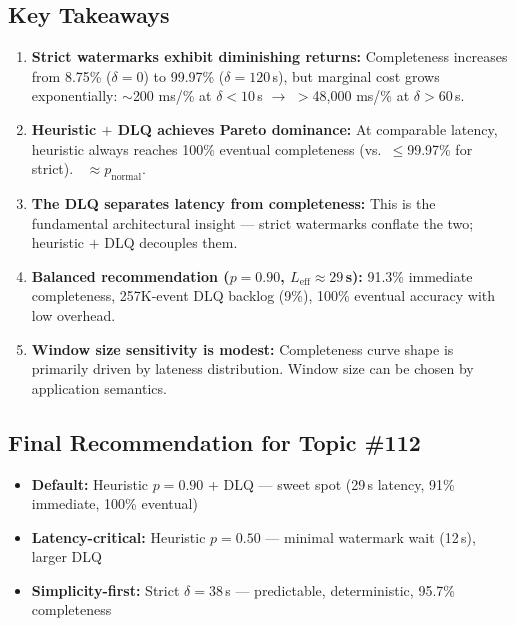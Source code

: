\documentclass[11pt,a4paper]{article}
\DeclareMathOperator{\Cimm}{C_{\text{imm}}}
\newcommand{\Leff}{L_{\text{eff}}}
\begin{document}
\subsection*{Key Takeaways}
\begin{enumerate}[leftmargin=*, itemsep=3pt]
  \item \textbf{Strict watermarks exhibit diminishing returns:} Completeness increases from 8.75\% ($\delta{=}0$) to 99.97\% ($\delta{=}120$\,s), but marginal cost grows exponentially: $\sim$200 ms/\% at $\delta{<}10$\,s $\to$ $>$48,000 ms/\% at $\delta{>}60$\,s.
  \item \textbf{Heuristic $+$ DLQ achieves Pareto dominance:} At comparable latency, heuristic always reaches 100\% eventual completeness (vs.\ $\leq$99.97\% for strict). $\Cimm \approx p_{\text{normal}}$.
  \item \textbf{The DLQ separates latency from completeness:} This is the fundamental architectural insight --- strict watermarks conflate the two; heuristic $+$ DLQ decouples them.
  \item \textbf{Balanced recommendation ($p{=}0.90$, $\Leff{\approx}29$\,s):} 91.3\% immediate completeness, 257K-event DLQ backlog (9\%), 100\% eventual accuracy with low overhead.
  \item \textbf{Window size sensitivity is modest:} Completeness curve shape is primarily driven by lateness distribution. Window size can be chosen by application semantics.
\end{enumerate}

\subsection*{Final Recommendation for Topic \#112}

\begin{itemize}[leftmargin=*, itemsep=3pt]
  \item \textbf{Default:} Heuristic $p{=}0.90$ + DLQ --- sweet spot (29\,s latency, 91\% immediate, 100\% eventual)
  \item \textbf{Latency-critical:} Heuristic $p{=}0.50$ --- minimal watermark wait (12\,s), larger DLQ
  \item \textbf{Simplicity-first:} Strict $\delta{=}38$\,s --- predictable, deterministic, 95.7\% completeness
\end{itemize}

\end{document}

